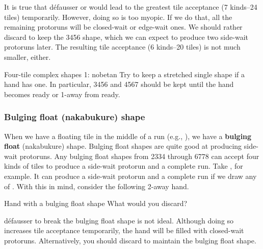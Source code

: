 {\bigskip 
\noindent
It is true that défausser {\LARGE{}} or {\LARGE{}} would lead to the greatest tile acceptance (7 kinds--24 tiles) temporarily. However, doing so is too myopic. If we do that, all the remaining protoruns will be closed-wait or edge-wait ones. We should rather discard {\LARGE{}} to keep the 3456 shape, which we can expect to produce two side-wait protoruns later. The resulting tile acceptance (6 kinds--20 tiles) is not much smaller, either. 

\bigskip

\color{MyRed}
\begin{itembox}[c]{Four-tile complex shapes 1: {\jap nobetan}}
\normalcolor
Try to keep a stretched single shape if a hand has one. In particular, 3456 and 4567 should be kept until the hand becomes ready or 1-away from ready. 
\end{itembox}
\normalcolor

\bigskip


\subsubsection{Bulging float ({\jap nakabukure}) shape}

When we have a floating tile in the middle of a run (e.g., {\LARGE{}}), we have a {\bf bulging float} ({\jap nakabukure}) shape. 
Bulging float shapes are quite good at producing side-wait protoruns. Any bulging float shapes from 2334 through 6778 can accept four kinds of tiles to produce a side-wait protorun and a complete run. Take {\LARGE{}}, for example. It can produce a side-wait protorun and a complete run if we draw any of {\LARGE{}}. 
With this in mind, consider the following 2-away hand.
\bigskip
\begin{itembox}[r]{Hand with a bulging float shape}
\bp
{}
\ep
\vspace{-10pt}What would you discard? \vspace{-5pt}
\end{itembox}
défausser {\LARGE{}} to break the bulging float shape is not ideal. Although doing so increases tile acceptance temporarily, the hand will be filled with closed-wait protoruns. Alternatively, you should discard {\LARGE{}} to maintain the bulging float shape. 

}
